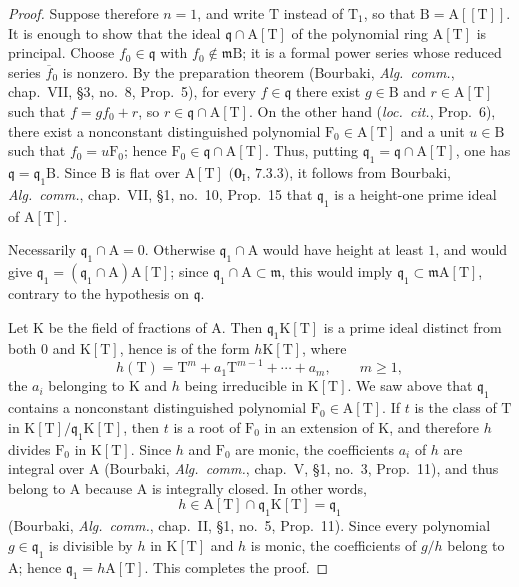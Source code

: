\begin{proof}
Suppose therefore $n=1$, and write $\mathrm{T}$ instead of $\mathrm{T}_1$, so that $\mathrm{B}=\mathrm{A}[[\mathrm{T}]]$. It is enough to show that the ideal $\mathfrak{q}\cap\mathrm{A}[\mathrm{T}]$ of the polynomial ring $\mathrm{A}[\mathrm{T}]$ is principal. Choose $f_0\in\mathfrak{q}$ with $f_0\notin\mathfrak{m}\mathrm{B}$; it is a formal power series whose reduced series $\overline{f}_0$ is nonzero. By the preparation theorem (Bourbaki, \emph{Alg.\ comm.}, chap.~VII, \S3, no.~8, Prop.~5), for every $f\in\mathfrak{q}$ there exist $g\in\mathrm{B}$ and $r\in\mathrm{A}[\mathrm{T}]$ such that $f=gf_0+r$, so $r\in\mathfrak{q}\cap\mathrm{A}[\mathrm{T}]$. On the other hand (\emph{loc.\ cit.}, Prop.~6), there exist a nonconstant distinguished polynomial $\mathrm{F}_0\in\mathrm{A}[\mathrm{T}]$ and a unit $u\in\mathrm{B}$ such that $f_0=u\mathrm{F}_0$; hence $\mathrm{F}_0\in\mathfrak{q}\cap\mathrm{A}[\mathrm{T}]$. Thus, putting $\mathfrak{q}_1=\mathfrak{q}\cap\mathrm{A}[\mathrm{T}]$, one has $\mathfrak{q}=\mathfrak{q}_1\mathrm{B}$. Since $\mathrm{B}$ is flat over $\mathrm{A}[\mathrm{T}]$ $(\mathbf{0}_{\mathrm{I}}$, $7.3.3)$, it follows from Bourbaki, \emph{Alg.\ comm.}, chap.~VII, \S1, no.~10, Prop.~15 that $\mathfrak{q}_1$ is a height-one prime ideal of $\mathrm{A}[\mathrm{T}]$.

Necessarily $\mathfrak{q}_1\cap\mathrm{A}=0$. Otherwise $\mathfrak{q}_1\cap\mathrm{A}$ would have height at least $1$, and  would give $\mathfrak{q}_1=(\mathfrak{q}_1\cap\mathrm{A})\mathrm{A}[\mathrm{T}]$; since $\mathfrak{q}_1\cap\mathrm{A}\subset\mathfrak{m}$, this would imply $\mathfrak{q}_1\subset\mathfrak{m}\mathrm{A}[\mathrm{T}]$, contrary to the hypothesis on $\mathfrak{q}$.

Let $\mathrm{K}$ be the field of fractions of $\mathrm{A}$. Then $\mathfrak{q}_1\mathrm{K}[\mathrm{T}]$ is a prime ideal distinct from both $0$ and $\mathrm{K}[\mathrm{T}]$, hence is of the form $h\mathrm{K}[\mathrm{T}]$, where
\[
  h(\mathrm{T})=\mathrm{T}^m+a_1\mathrm{T}^{m-1}+\cdots+a_m,
  \qquad m\geq1,
\]
the $a_i$ belonging to $\mathrm{K}$ and $h$ being irreducible in $\mathrm{K}[\mathrm{T}]$. We saw above that $\mathfrak{q}_1$ contains a nonconstant distinguished polynomial $\mathrm{F}_0\in\mathrm{A}[\mathrm{T}]$. If $t$ is the class of $\mathrm{T}$ in $\mathrm{K}[\mathrm{T}]/\mathfrak{q}_1\mathrm{K}[\mathrm{T}]$, then $t$ is a root of $\mathrm{F}_0$ in an extension of $\mathrm{K}$, and therefore $h$ divides $\mathrm{F}_0$ in $\mathrm{K}[\mathrm{T}]$. Since $h$ and $\mathrm{F}_0$ are monic, the coefficients $a_i$ of $h$ are integral over $\mathrm{A}$ (Bourbaki, \emph{Alg.\ comm.}, chap.~V, \S1, no.~3, Prop.~11), and thus belong to $\mathrm{A}$ because $\mathrm{A}$ is integrally closed. In other words,
\[
  h\in\mathrm{A}[\mathrm{T}]\cap\mathfrak{q}_1\mathrm{K}[\mathrm{T}]=\mathfrak{q}_1
\]
(Bourbaki, \emph{Alg.\ comm.}, chap.~II, \S1, no.~5, Prop.~11). Since every polynomial $g\in\mathfrak{q}_1$ is divisible by $h$ in $\mathrm{K}[\mathrm{T}]$ and $h$ is monic, the coefficients of $g/h$ belong to $\mathrm{A}$; hence $\mathfrak{q}_1=h\mathrm{A}[\mathrm{T}]$. This completes the proof.
\end{proof}

